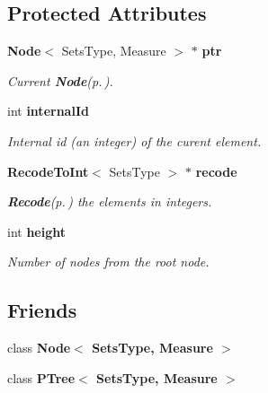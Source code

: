 \subsection*{Protected Attributes}
\begin{CompactItemize}
\item 
{\bf Node}$<$ Sets\-Type, Measure $>$ $\ast$ {\bf ptr}\label{class_it_p_tree_9f4c498657335bce50e4336cb775e729}

\begin{CompactList}\small\item\em Current {\bf Node}{\rm (p.\,\pageref{class_node})}. \item\end{CompactList}\item 
int {\bf internal\-Id}\label{class_it_p_tree_fb87b00832503526833a7d793f582f79}

\begin{CompactList}\small\item\em Internal id (an integer) of the curent element. \item\end{CompactList}\item 
{\bf Recode\-To\-Int}$<$ Sets\-Type $>$ $\ast$ {\bf recode}\label{class_it_p_tree_b6b3b71b329222db27d080d47bf8039a}

\begin{CompactList}\small\item\em {\bf Recode}{\rm (p.\,\pageref{class_recode})} the elements in integers. \item\end{CompactList}\item 
int {\bf height}\label{class_it_p_tree_967c7b9bba31e69d9e5acbc40906e3ab}

\begin{CompactList}\small\item\em Number of nodes from the root node. \item\end{CompactList}\end{CompactItemize}
\subsection*{Friends}
\begin{CompactItemize}
\item 
class {\bf Node$<$ Sets\-Type, Measure $>$}\label{class_it_p_tree_56b777f68cd8d1ed34d04e1cc4e96041}

\item 
class {\bf PTree$<$ Sets\-Type, Measure $>$}\label{class_it_p_tree_75985e4c63d08b10230ccb3b9f097182}

\end{CompactItemize}



